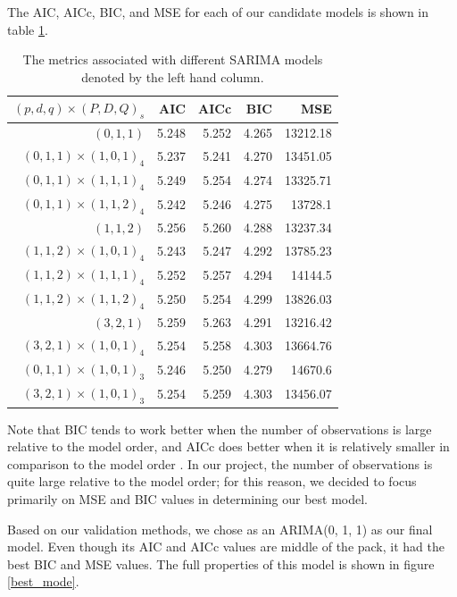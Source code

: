 \documentclass[11pt]{paper}
\begin{document}
The AIC, AICc, BIC, and MSE for each of our candidate models is shown in table \ref{results}.

\begin{table}
\centering
\begin{tabular}{r || r | r| r| r}
$(p, d, q) \times(P, D, Q)_s$   & AIC   &AICc   &BIC    &MSE\\
\hline
$(0, 1, 1)$               & 5.248 &5.252  &4.265  &13212.18\\
$(0, 1, 1) \times (1, 0, 1)_4$   & 5.237 &5.241  &4.270  &13451.05\\ %
$(0, 1, 1) \times (1, 1, 1)_4$   & 5.249 &5.254  &4.274  &13325.71\\
$(0, 1, 1) \times (1, 1, 2)_4$   & 5.242 &5.246  &4.275  &13728.1\\
\hline
$(1, 1, 2)$               & 5.256 & 5.260 &4.288  &13237.34\\
$(1, 1, 2) \times (1, 0, 1)_4$   & 5.243 &5.247  &4.292  &13785.23\\ %
$(1, 1, 2) \times (1, 1, 1)_4$   & 5.252 & 5.257 &4.294  &14144.5\\
$(1, 1, 2)\times (1, 1, 2)_4$   & 5.250 & 5.254 & 4.299 &13826.03\\
\hline
$(3, 2, 1)$             & 5.259& 5.263& 4.291 & 13216.42\\
$(3, 2, 1) \times (1, 0, 1)_4$ & 5.254& 5.258 & 4.303 &13664.76\\
\hline
$(0, 1, 1) \times (1, 0, 1)_3$ & 5.246 & 5.250 & 4.279 & 14670.6\\
$(3, 2, 1) \times (1, 0, 1)_3$ & 5.254 & 5.259 & 4.303 & 13456.07
\end{tabular}
\caption{The metrics associated with different SARIMA models denoted by the left hand column.}
\label{results}
\end{table}


Note that BIC tends to work better when the number of observations is large relative to the model order, and AICc does better when it is relatively smaller in comparison to the model order \cite{timeseriesanalysis}. In our project, the number of observations is quite large relative to the model order; for this reason, we decided to focus primarily on MSE and BIC values in determining our best model.

Based on our validation methods, we chose as an ARIMA(0, 1, 1) as our final model. Even though its AIC and AICc values are middle of the pack, it had the best BIC and MSE values. The full properties of this model is shown in figure \ref{best_mode}. 
\end{document}
